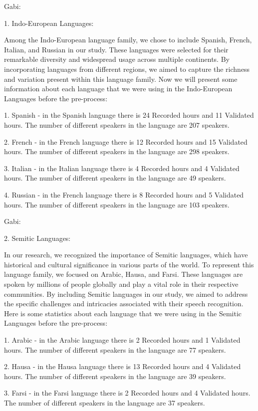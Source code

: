 \documentclass[a4paper]{article}
\begin{document}
Gabi:

1. Indo-European Languages:

Among the Indo-European language family, we chose to include Spanish, French, Italian, and Russian in our study. These languages were selected for their remarkable diversity and widespread usage across multiple continents. By incorporating languages from different regions, we aimed to capture the richness and variation present within this language family. Now we will present some information about each language that we were using in the Indo-European Languages before the pre-process:

1. Spanish - in the Spanish language there is 24 Recorded hours and 11 Validated hours. The number of different speakers in the language are 207 speakers.

2. French - in the French language there is 12 Recorded hours and 15 Validated hours. The number of different speakers in the language are 298 speakers.

3. Italian - in the Italian language there is 4 Recorded hours and 4 Validated hours. The number of different speakers in the language are 49 speakers.

4. Russian - in the French language there is 8 Recorded hours and 5 Validated hours. The number of different speakers in the language are 103 speakers.\newline

Gabi:

2. Semitic Languages:

In our research, we recognized the importance of Semitic languages, which have historical and cultural significance in various parts of the world. To represent this language family, we focused on Arabic, Hausa, and Farsi. These languages are spoken by millions of people globally and play a vital role in their respective communities. By including Semitic languages in our study, we aimed to address the specific challenges and intricacies associated with their speech recognition. Here is some statistics about each language that we were using in the Semitic Languages before the pre-process:

1. Arabic - in the Arabic language there is 2 Recorded hours and 1 Validated hours. The number of different speakers in the language are 77 speakers.

2. Hausa - in the Hausa language there is 13 Recorded hours and 4 Validated hours. The number of different speakers in the language are 39 speakers.

3. Farsi - in the Farsi language there is 2 Recorded hours and 4 Validated hours. The number of different speakers in the language are 37 speakers.\newline
\end{document}
